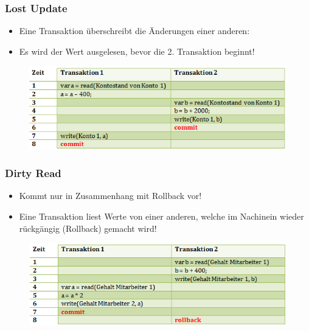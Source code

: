 \subsubsection{Lost Update}
\begin{itemize}
    \item Eine Transaktion überschreibt die Änderungen einer anderen:
    \item Es wird der Wert ausgelesen, bevor die 2. Transaktion beginnt!
\end{itemize}
\begin{figure}[H]
    \centering
    \includegraphics{res/themenkorb_5/lostupdate.png}
\end{figure}
\subsubsection{Dirty Read}
\begin{itemize}
    \item Kommt nur in Zusammenhang mit Rollback vor!
    \item Eine Transaktion liest Werte von einer anderen, welche im Nachinein wieder rückgängig (Rollback) gemacht wird!
\end{itemize}
\begin{figure}[H]
    \centering
    \includegraphics{res/themenkorb_5/dirtyread.png}
\end{figure}
